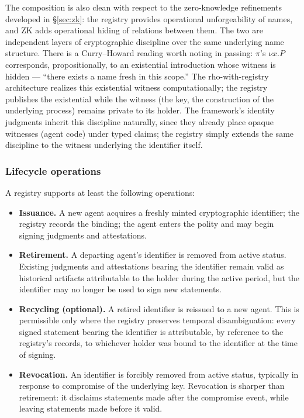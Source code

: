 \documentclass[11pt]{article}
\theoremstyle{definition}
\theoremstyle{plain}
\theoremstyle{remark}
\begin{document}
The composition is also clean with respect to the zero-knowledge refinements developed in \S\ref{sec:zk}: the registry provides operational unforgeability of names, and ZK adds operational hiding of relations between them. The two are independent layers of cryptographic discipline over the same underlying name structure. There is a Curry--Howard reading worth noting in passing: $\pi$'s $\nu x.P$ corresponds, propositionally, to an existential introduction whose witness is hidden --- ``there exists a name fresh in this scope.'' The rho-with-registry architecture realizes this existential witness computationally; the registry publishes the existential while the witness (the key, the construction of the underlying process) remains private to its holder. The framework's identity judgments inherit this discipline naturally, since they already place opaque witnesses (agent code) under typed claims; the registry simply extends the same discipline to the witness underlying the identifier itself.

\subsubsection*{Lifecycle operations}

A registry supports at least the following operations:

\begin{itemize}[leftmargin=*]
\item \textbf{Issuance.} A new agent acquires a freshly minted cryptographic identifier; the registry records the binding; the agent enters the polity and may begin signing judgments and attestations.
\item \textbf{Retirement.} A departing agent's identifier is removed from active status. Existing judgments and attestations bearing the identifier remain valid as historical artifacts attributable to the holder during the active period, but the identifier may no longer be used to sign new statements.
\item \textbf{Recycling (optional).} A retired identifier is reissued to a new agent. This is permissible only where the registry preserves temporal disambiguation: every signed statement bearing the identifier is attributable, by reference to the registry's records, to whichever holder was bound to the identifier at the time of signing.
\item \textbf{Revocation.} An identifier is forcibly removed from active status, typically in response to compromise of the underlying key. Revocation is sharper than retirement: it disclaims statements made after the compromise event, while leaving statements made before it valid.
\end{itemize}
\end{document}
